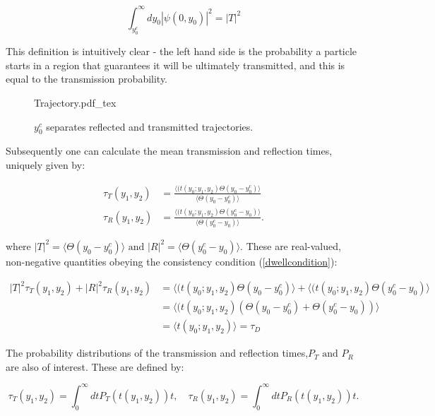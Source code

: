 \documentclass{article}
\newcommand{\incfig}[1]{%
    \def\svgwidth{10cm}
    {#1.pdf_tex}
}
\begin{document}
\begin{equation}
	\int_{y_0^c}^\infty dy_0 |\psi(0,y_0)|^2=|T|^2
\end{equation}

\noindent This definition is intuitively clear - the left hand side is the probability a particle starts in a region that guarantees it will be ultimately transmitted, and this is equal to the transmission probability.

\begin{figure}[ht]
    \centering
    \incfig{Trajectory}
    \caption{$y_0^c$ separates reflected and transmitted trajectories.}
    \label{fig:trajectories}
\end{figure}

\noindent Subsequently one can calculate the mean transmission and reflection times, uniquely given by:

\begin{align}
	\tau_T(y_1,y_2)&=\frac{\langle(t(y_0;y_1,y_2)\Theta(y_0-y_0^c)\rangle}{\langle\Theta(y_0-y_0^c)\rangle}\\
	\tau_R(y_1,y_2)&=\frac{\langle(t(y_0;y_1,y_2)\Theta(y_0^c-y_0)\rangle}{\langle\Theta(y_0^c-y_0)\rangle}.
\end{align}

\noindent where $|T|^2 = \langle\Theta(y_0-y_0^c)\rangle \text{ and } |R|^2 = \langle\Theta(y_0^c-y_0)\rangle$. These are real-valued, non-negative quantities obeying the consistency condition (\ref{dwellcondition}):

\begin{subequations}
\begin{align}
	|T|^2\tau_T(y_1,y_2)+|R|^2\tau_R(y_1,y_2) &= \langle(t(y_0;y_1,y_2)\Theta(y_0-y_0^c)\rangle+\langle(t(y_0;y_1,y_2)\Theta(y_0^c-y_0)\rangle\\
						  &= \langle(t(y_0;y_1,y_2)(\Theta(y_0-y_0^c)+\Theta(y_0^c-y_0))\rangle\\
						  &= \langle t(y_0;y_1,y_2) \rangle = \tau_D
\end{align}
\end{subequations}

\noindent The probability distributions of the transmission and reflection times,$P_T \text{ and } P_R$ are also of interest. These are defined by:

\begin{equation}
	\tau_T(y_1,y_2) = \int_0^\infty dt P_T(t(y_1,y_2))t, \quad \tau_R(y_1,y_2) = \int_0^\infty dt P_R(t(y_1,y_2))t.
\end{equation}
\end{document}
